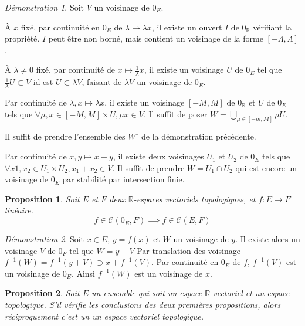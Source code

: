 \documentclass[a4paper, 11pt, french]{book}
\newenvironment{itemise}{\itemize}{\enditemize}
\theoremstyle{plain} %
\newtheorem{proposition}{Proposition}
\theoremstyle{definition} %
\theoremstyle{remark} %
\newtheorem*{demonstration}{Démonstration}
\newcommand{\1}{\mathds{1}}
\newcommand{\cont}{\mathcal{C}}
\newcommand{\inv}[1]{#1^{-1}}
\newcommand{\R}{\mathbb{R}}
\begin{document}
\begin{demonstration}
	Soit $V$ un voisinage de $0_E$.
	\begin{itemise}
		\item À $x$ fixé, par continuité en $0_E$ de $\lambda\longmapsto\lambda x$, il existe un ouvert $I$ de $0_\R$ vérifiant la propriété.
		$I$ peut être non borné, mais contient un voisinage de la forme $[-\Lambda, \Lambda]$.
		\item À $\lambda\neq0$ fixé, par continuité de $x\longmapsto\frac{1}{\lambda}x$, il existe un voisinage $U$ de $0_E$ tel que $\frac{1}{\lambda}U\subset V$ id est $U\subset\lambda V$, faisant de $\lambda V$ un voisinage de $0_E$.
		\item Par continuité de $\lambda, x\longmapsto\lambda x$, il existe un voisinage $[-M, M]$ de $0_\R$ et $U$ de $0_E$ tels que $\forall\mu, x\in[-M, M]\times U, \mu x\in V$.
		Il suffit de poser $W=\bigcup_{\mu\in[-m, M]}\mu U$.
		\item Il suffit de prendre l'ensemble des $W^\circ$ de la démonstration précédente.
		\item Par continuité de $x, y\longmapsto x+y$, il existe deux voisinages $U_1$ et $U_2$ de $0_E$ tels que $\forall x1, x_2\in U_1\times U_2, x_1+x_2\in V$.
		Il suffit de prendre $W=U_1\cap U_2$ qui est encore un voisinage de $0_E$ par stabilité par intersection finie.
	\end{itemise}
\end{demonstration}

\begin{proposition}
	Soit $E$ et $F$ deux $\R$-espaces vectoriels topologiques, et $f:E\rightarrow F$ linéaire.
	$$
		f\in\cont(0_E, F)\implies f\in\cont(E, F)
	$$
\end{proposition}

\begin{demonstration}
	Soit $x\in E$, $y=f(x)$ et $W$ un voisinage de $y$.
	Il existe alors un voisinage $V$ de $0_F$ tel que $W=y+V$
	Par translation des voisinage $\inv{f}(W)=\inv{f}(y+V)\supset x+\inv{f}(V)$.
	Par continuité en $0_E$ de $f$, $\inv{f}(V)$ est un voisinage de $0_E$.
	Ainsi $\inv{f}(W)$ est un voisinage de $x$.
\end{demonstration}

\begin{proposition}
	Soit $E$ un ensemble qui soit un espace $\R$-vectoriel et un espace topologique.
	S'il vérifie les conclusions des deux premières propositions, alors réciproquement c'est un un espace vectoriel topologique.
\end{proposition}
\end{document}
